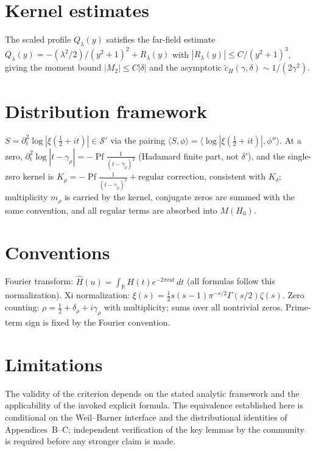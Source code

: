 \documentclass[11pt]{article}
\begin{document}
\appendix
\section{Kernel estimates}
The scaled profile $Q_\lambda(y)$ satisfies the far-field estimate
$Q_\lambda(y)=-(\lambda^2/2)/(y^2+1)^2+R_\lambda(y)$ with
$|R_\lambda(y)|\le C/(y^2+1)^3$, giving the moment bound $|M_2|\le C|\delta|$
and the asymptotic $\widetilde c_H(\gamma,\delta)\sim 1/(2\gamma^2)$.

\section{Distribution framework}
$S=\partial_t^2\log|\xi(\tfrac12+it)|\in\mathcal S'$ via the pairing
$\langle S,\phi\rangle=\langle\log|\xi(\tfrac12+it)|,\phi''\rangle$.  At a
zero,
$\partial_t^2\log|t-\gamma_\rho|=-\operatorname{Pf}\frac1{(t-\gamma_\rho)^2}$
(Hadamard finite part, not $\delta'$), and the single-zero kernel is
$K_\rho=-\operatorname{Pf}\frac1{(t-\gamma_\rho)^2}+\text{regular
correction}$, consistent with $K_\delta$; multiplicity $m_\rho$ is carried
by the kernel, conjugate zeros are summed with the same convention, and
all regular terms are absorbed into $M(H_0)$.

\section{Conventions}
Fourier transform: $\widehat H(u)=\int_{\mathbb R}H(t)e^{-2\pi iut}\,dt$
(all formulas follow this normalization).  Xi normalization:
$\xi(s)=\tfrac12s(s-1)\pi^{-s/2}\Gamma(s/2)\zeta(s)$.  Zero counting:
$\rho=\tfrac12+\delta_\rho+i\gamma_\rho$ with multiplicity; sums over all
nontrivial zeros.  Prime-term sign is fixed by the Fourier convention.

\section*{Limitations}
The validity of the criterion depends on the stated analytic framework
and the applicability of the invoked explicit formula.  The equivalence
established here is conditional on the Weil--Barner interface and the
distributional identities of Appendices~B--C; independent verification of
the key lemmas by the community is required before any stronger claim is
made.
\end{document}
